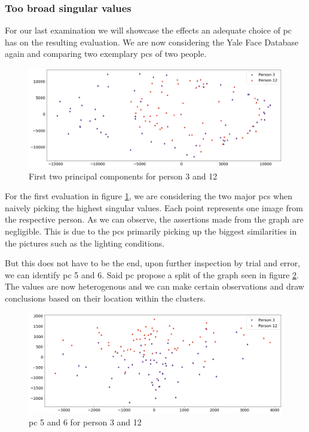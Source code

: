 \subsubsection{Too broad singular values}

For our last examination we will showcase the effects an adequate choice of \acrlong{pc} has on the resulting evaluation.
We are now considering the Yale Face Database again and comparing two exemplary \glspl{pc} of two people.

\begin{center}
    \begin{figure}[h]
      \centering
      \includegraphics[width=0.9\linewidth]{external_content/media/choice_of_pc/p3_12-pc1_2-centered.png}
      \captionsetup{justification=centering}
      \caption{First two principal components for person 3 and 12}
      \label{fig:pcIandII}
    \end{figure}
\end{center}

\vspace{-8mm}
For the first evaluation in figure \ref{fig:pcIandII}, we are considering the two major \glspl{pc} when naively picking the highest singular values.
Each point represents one image from the respective person.
As we can observe, the assertions made from the graph are negligible.
This is due to the \glspl{pc} primarily picking up the biggest similarities in the pictures such as the lighting conditions.

But this does not have to be the end, upon further inspection by trial and error, we can identify \gls{pc} 5 and 6.
Said \gls{pc} propose a split of the graph seen in figure \ref{fig:pcVandVI}.
The values are now heterogenous and we can make certain observations and draw conclusions based on their location within the clusters.

\begin{center}
    \begin{figure}[h]
      \centering
      \includegraphics[width=0.9\linewidth]{external_content/media/choice_of_pc/p3_12-pc5_6-centered.png}
      \captionsetup{justification=centering}
      \caption{\gls{pc} 5 and 6 for person 3 and 12}
      \label{fig:pcVandVI}
    \end{figure}
\end{center}

